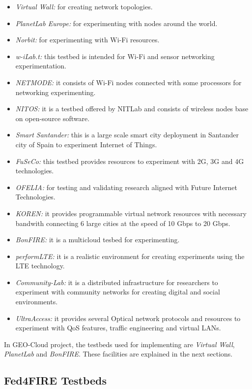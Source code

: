 \begin{itemize}
\begin{itemize}
\item \emph{Virtual Wall:} for creating network topologies.
\item \emph{PlanetLab Europe:} for experimenting with nodes around the world.
\item \emph{Norbit:} for experimenting with Wi-Fi resources.
\item \emph{w-iLab.t:} this testbed is intended for Wi-Fi and sensor networking experimentation.
\item \emph{NETMODE:} it consists of Wi-Fi nodes connected with some processors
  for networking experimenting.
\item \emph{NITOS:} it is a testbed offered by NITLab and consists of wireless
  nodes base on open-source software.
\item \emph{Smart Santander:} this is a large scale smart city deployment in
  Santander city of Spain to experiment Internet of Things.
\item \emph{FuSeCo:} this testbed provides resources to experiment with 2G, 3G
  and 4G technologies.
\item \emph{OFELIA:} for testing and validating research aligned
  with Future Internet Technologies.
\item \emph{KOREN:} it provides programmable virtual network resources with
  necessary bandwith connecting 6 large cities at the speed of 10 Gbps to 20 Gbps.
\item \emph{BonFIRE:} it is a multicloud tesbed for experimenting.
\item \emph{performLTE:} it is a realistic environment for creating experiments
  using the \ac{LTE} technology.
\item \emph{Community-Lab:} it is a distributed infrastructure for researchers
  to experiment with community networks for creating digital and social environments.
\item \emph{UltraAccess:} it provides several Optical network protocols and
  resources to experiment with \ac{QoS} features, traffic engineering and virtual \acp{LAN}.
\end{itemize}
\end{itemize}


In GEO-Cloud project, the testbeds used for implementing are \emph{Virtual
  Wall}, \emph{PlanetLab} and \emph{BonFIRE}. These facilities are explained in the next sections.

\subsection{Fed4FIRE Testbeds}

